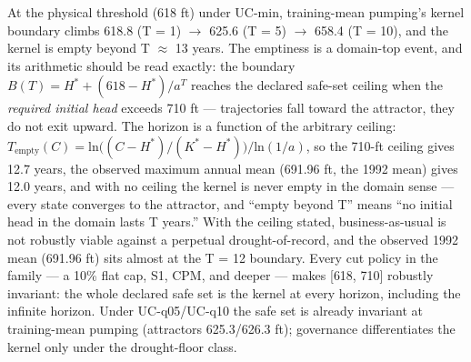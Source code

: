At the physical threshold (618 ft) under UC-min, training-mean pumping's
kernel boundary climbs 618.8 (T = 1) \ensuremath{\rightarrow} 625.6 (T = 5) \ensuremath{\rightarrow} 658.4 (T = 10),
and the kernel is empty beyond T \ensuremath{\approx} 13 years. The emptiness is a
domain-top event, and its arithmetic should be read exactly: the
boundary \(B(T) = H^{\ast} + (618 - H^{\ast})/a^{T}\) reaches the
declared safe-set ceiling when the \emph{required initial head} exceeds
710 ft --- trajectories fall toward the attractor, they do not exit
upward. The horizon is a function of the arbitrary ceiling:
\(T_{\mathrm{empty}}(C) = \mathrm{ln}\bigl((C - H^{\ast})/(K^{\ast} - H^{\ast})\bigr)/\mathrm{ln}(1/a)\),
so the 710-ft ceiling gives 12.7 years, the observed maximum annual mean
(691.96 ft, the 1992 mean) gives 12.0 years, and with no ceiling the
kernel is never empty in the domain sense --- every state converges to
the attractor, and ``empty beyond T'' means ``no initial head in the
domain lasts T years.'' With the ceiling stated, business-as-usual is
not robustly viable against a perpetual drought-of-record, and the
observed 1992 mean (691.96 ft) sits almost at the T = 12 boundary. Every
cut policy in the family --- a 10\% flat cap, S1, CPM, and deeper ---
makes {[}618, 710{]} robustly invariant: the whole declared safe set is
the kernel at every horizon, including the infinite horizon. Under
UC-q05/UC-q10 the safe set is already invariant at training-mean pumping
(attractors 625.3/626.3 ft); governance differentiates the kernel only
under the drought-floor class.

